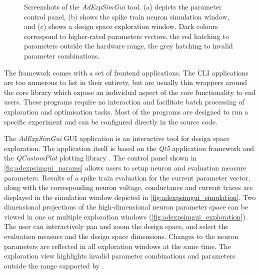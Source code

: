 \begin{figure}[t]
{		\label{fig:adexpsimgui_simulation}%
	}
	\caption[Screenshots of the AdExpSimGui tool]{Screenshots of the \emph{AdExpSimGui} tool. (a) depicts the parameter control panel, (b) shows the spike train neuron simulation window, and (c) shows a design space exploration window. Dark colours correspond to higher-rated parameters vectors, the red hatching to parameters outside the hardware range, the grey hatching to invalid parameter combinations.}
	\label{fig:adexpsimgui}
\end{figure}

The \AdExpSim framework comes with a set of frontend applications. The \acrfull{CLI} applications are too numerous to list in their entirety, but are usually thin wrappers around the core library which expose an individual aspect of the core functionality to end users. These programs require no interaction and facilitate batch processing of exploration and optimisation tasks. Most of the programs are designed to run a specific experiment and can be configured directly in the source code.

The \emph{AdExpSimGui} \acrfull{GUI} application is an interactive tool for design space exploration. The application itself is based on the \emph{Qt5} application framework and the \emph{QCustomPlot} plotting library \cite{qt5,qcustomplot}. The control panel shown in \cref{fig:adexpsimgui_params} allows users to setup neuron and evaluation measure parameters. Results of a spike train evaluation for the current parameter vector, along with the corresponding neuron voltage, conductance and current traces are displayed in the simulation window depicted in \cref{fig:adexpsimgui_simulation}. Two dimensional projections of the high-dimensional neuron parameter space can be viewed in one or multiple exploration windows (\cref{fig:adexpsimgui_exploration}). The user can interactively pan and zoom the design space, and select the evaluation measure and the design space dimensions. Changes to the neuron parameters are reflected in all exploration windows at the same time. The exploration view highlights invalid parameter combinations and parameters outside the range supported by \NMPM.

